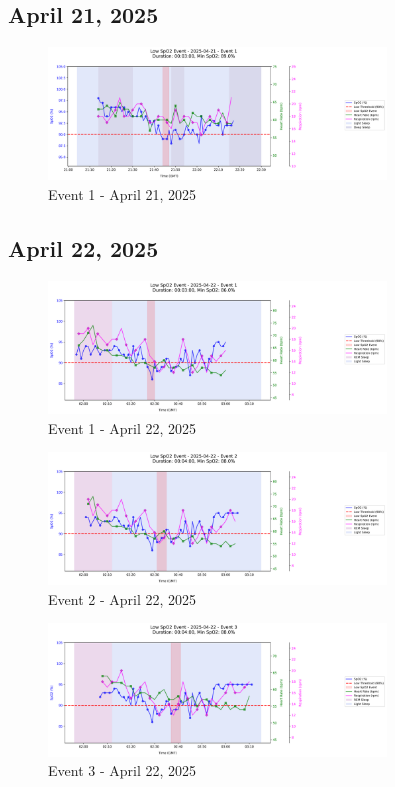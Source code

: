 \documentclass{article}
\begin{document}
\subsection{April 21, 2025}
\begin{figure}[htbp]
    \centering
    \includegraphics[width=0.8\textwidth]{images/2025-04-21_event_1.png}
    \caption{Event 1 - April 21, 2025}
\end{figure}
\clearpage

\subsection{April 22, 2025}
\begin{figure}[htbp]
    \centering
    \includegraphics[width=0.8\textwidth]{images/2025-04-22_event_1.png}
    \caption{Event 1 - April 22, 2025}
\end{figure}
\begin{figure}[htbp]
    \centering
    \includegraphics[width=0.8\textwidth]{images/2025-04-22_event_2.png}
    \caption{Event 2 - April 22, 2025}
\end{figure}
\begin{figure}[htbp]
    \centering
    \includegraphics[width=0.8\textwidth]{images/2025-04-22_event_3.png}
    \caption{Event 3 - April 22, 2025}
\end{figure}
\clearpage
\end{document}
